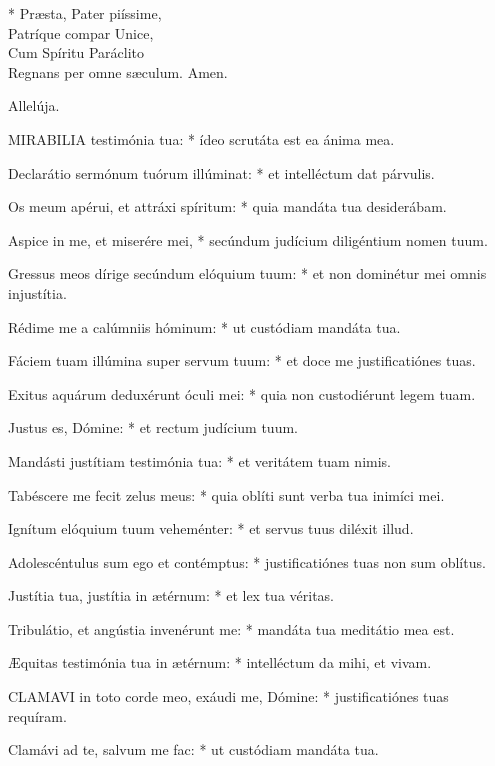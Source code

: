 * Præsta, Pater piíssime,\\
Patríque compar Unice,\\
Cum Spíritu Paráclito\\
Regnans per omne sæculum. Amen.



 Allelúja.


\lettrine[lines=2]{M}{IRABILIA} testimónia tua: * ídeo scrutáta est ea ánima mea.

Declarátio sermónum tuórum illúminat: * et intelléctum dat párvulis.

Os meum apérui, et attráxi spíritum: * quia mandáta tua desiderábam.

Aspice in me, et miserére mei, * secúndum judícium diligéntium nomen tuum.

Gressus meos dírige secúndum elóquium tuum: * et non dominétur mei omnis injustítia.

Rédime me a calúmniis hóminum: * ut custódiam mandáta tua.

Fáciem tuam illúmina super servum tuum: * et doce me justificatiónes tuas.

Exitus aquárum deduxérunt óculi mei: * quia non custodiérunt legem tuam.

Justus es, Dómine: * et rectum judícium tuum.

Mandásti justítiam testimónia tua: * et veritátem tuam nimis.

Tabéscere me fecit zelus meus: * quia oblíti sunt verba tua inimíci mei.

Ignítum elóquium tuum veheménter: * et servus tuus diléxit illud.

Adolescéntulus sum ego et contémptus: * justificatiónes tuas non sum oblítus.

Justítia tua, justítia in ætérnum: * et lex tua véritas.

Tribulátio, et angústia invenérunt me: * mandáta tua meditátio mea est.

Æquitas testimónia tua in ætérnum: * intelléctum da mihi, et vivam.


\lettrine[lines=2]{C}{LAMAVI} in toto corde meo, exáudi me, Dómine: * justificatiónes tuas requíram.

Clamávi ad te, salvum me fac: * ut custódiam mandáta tua.

